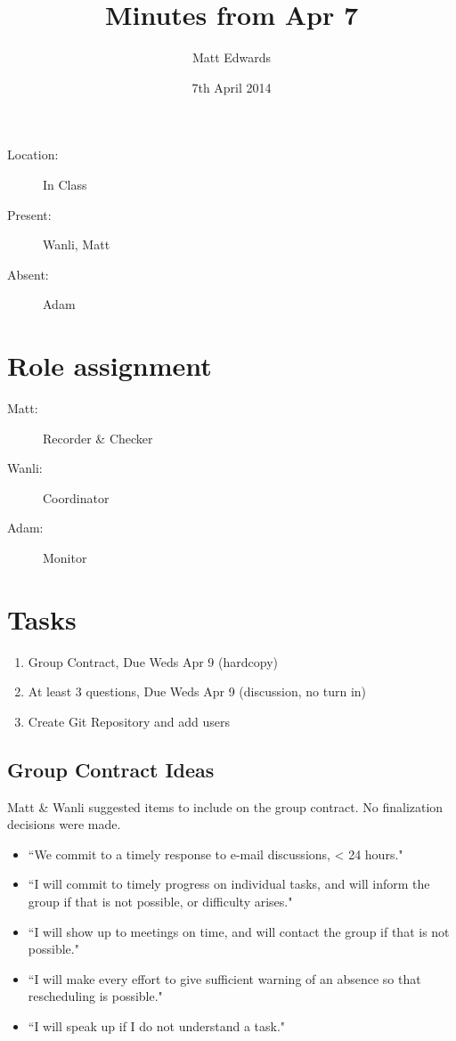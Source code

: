 \documentclass{article}
\title{Minutes from Apr 7}
\author{Matt Edwards}
\date{7th April 2014}
\begin{document}
\maketitle

\begin{description}
\item[Location:] In Class
\item[Present:] Wanli, Matt
\item[Absent:] Adam
\end{description}

\section{Role assignment}
\begin{description}
\item[Matt:]Recorder \& Checker
\item[Wanli:]Coordinator
\item[Adam:]Monitor
\end{description}

\section{Tasks}
\begin{enumerate}
\item Group Contract, Due Weds Apr 9 (hardcopy)
\item At least 3 questions, Due Weds Apr 9 (discussion, no turn in)
\item Create Git Repository and add users
\end{enumerate}

\subsection{Group Contract Ideas}
Matt \& Wanli suggested items to include on the group contract. No finalization decisions were made.

\begin{itemize}
\item ``We commit to a timely response to e-mail discussions, < 24 hours."
\item ``I will commit to timely progress on individual tasks, and will inform the group if that is not possible, or difficulty arises."
\item ``I will show up to meetings on time, and will contact the group if that is not possible."
\item ``I will make every effort to give sufficient warning of an absence so that rescheduling is possible."
\item ``I will speak up if I do not understand a task."
\end{itemize}
\end{document}
